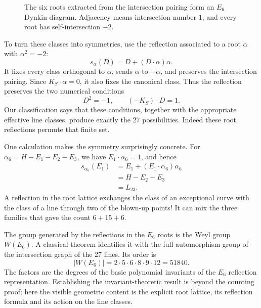 \begin{figure}[htbp]
\centering
{}
\caption{The six roots extracted from the intersection pairing form an \(E_6\) Dynkin diagram. Adjacency means intersection number \(1\), and every root has self-intersection \(-2\).}
\label{fig:N20261109-E6}
\end{figure}

To turn these classes into symmetries, use the reflection associated to a root \(\alpha\) with \(\alpha^2=-2\):
\begin{equation}
 s_\alpha(D)=D+(D\cdot\alpha)\alpha.
 \label{eq:N20261109-reflection}
\end{equation}
It fixes every class orthogonal to \(\alpha\), sends \(\alpha\) to \(-\alpha\), and preserves the intersection pairing. Since \(K_S\cdot\alpha=0\), it also fixes the canonical class. Thus the reflection preserves the two numerical conditions
\[
 D^2=-1,\qquad (-K_S)\cdot D=1.
\]
Our classification says that these conditions, together with the appropriate effective line classes, produce exactly the 27 possibilities. Indeed these root reflections permute that finite set.

One calculation makes the symmetry surprisingly concrete. For
\(\alpha_6=H-E_1-E_2-E_3\), we have \(E_1\cdot\alpha_6=1\), and hence
\begin{align*}
 s_{\alpha_6}(E_1)
 &=E_1+(E_1\cdot\alpha_6)\alpha_6\\
 &=H-E_2-E_3\\
 &=L_{23}.
\end{align*}
A reflection in the root lattice exchanges the class of an exceptional curve with the class of a line through two of the blown-up points! It can mix the three families that gave the count \(6+15+6\).

The group generated by the reflections in the \(E_6\) roots is the Weyl group \(W(E_6)\). A classical theorem identifies it with the full automorphism group of the intersection graph of the 27 lines. Its order is
\begin{equation}
 |W(E_6)|=2\cdot5\cdot6\cdot8\cdot9\cdot12
 =51840.
 \label{eq:N20261109-WeylOrder}
\end{equation}
The factors are the degrees of the basic polynomial invariants of the \(E_6\) reflection representation. Establishing the invariant-theoretic result is beyond the counting proof; here the visible geometric content is the explicit root lattice, its reflection formula and its action on the line classes.

